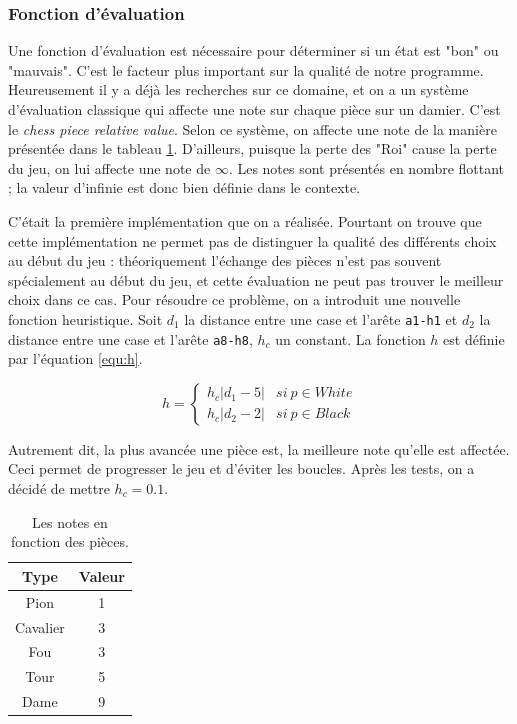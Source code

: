 \documentclass{article}
\begin{document}
\subsubsection{Fonction d'évaluation}
\par Une fonction d'évaluation est nécessaire pour déterminer si un état est "bon" ou "mauvais". C'est le facteur plus important sur la qualité de notre programme. Heureusement il y a déjà les recherches sur ce domaine, et on a un système d'évaluation classique qui affecte une note sur chaque pièce sur un damier. C'est le \textit{chess piece relative value}\cite{enwiki:value}. Selon ce système, on affecte une note de la manière présentée dans le tableau \ref{tab:score}. D'ailleurs, puisque la perte des "Roi" cause la perte du jeu, on lui affecte une note de $\infty$. Les notes sont présentés en nombre flottant ; la valeur d'infinie est donc bien définie dans le contexte.

\par C'était la première implémentation que on a réalisée. Pourtant on trouve que cette implémentation ne permet pas de distinguer la qualité des différents choix au début du jeu : théoriquement l'échange des pièces n'est pas souvent spécialement au début du jeu, et cette évaluation ne peut pas trouver le meilleur choix dans ce cas. Pour résoudre ce problème, on a introduit une nouvelle fonction heuristique. Soit $d_1$ la distance entre une case et l'arête \texttt{a1-h1} et $d_2$ la distance entre une case et l'arête \texttt{a8-h8}, $h_c$ un constant. La fonction $h$ est définie par l'équation \ref{equ:h}.

\begin{equation}\label{equ:h}
    h = \left\lbrace
    \begin{array}{lr}
        h_c \left\lvert d_1 - 5 \right\rvert & si \ p \in White \\
        h_c \left\lvert d_2 - 2 \right\rvert & si \ p \in Black
    \end{array}
    \right.
\end{equation} 

Autrement dit, la plus avancée une pièce est, la meilleure note qu'elle est affectée. Ceci permet de progresser le jeu et d'éviter les boucles. Après les tests, on a décidé de mettre $h_c = 0.1$.

\begin{table}
    \centering
    \begin{tabular}[htb]{|c|c|}
        \hline
        Type & Valeur \\
        \hline
        Pion & 1 \\
        \hline
        Cavalier & 3 \\
        \hline
        Fou & 3 \\
        \hline
        Tour & 5 \\
        \hline
        Dame & 9 \\
        \hline
    \end{tabular}
    \caption{Les notes en fonction des pièces.}
    \label{tab:score}
\end{table}
\end{document}
